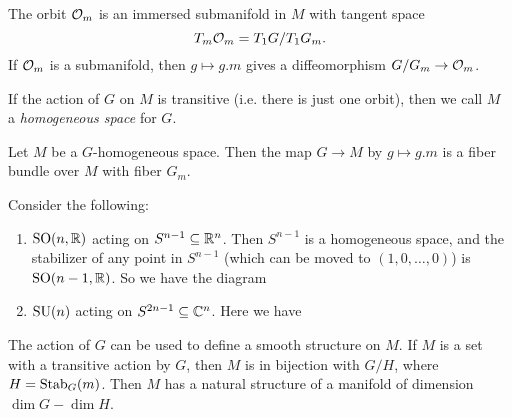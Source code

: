 \begin{corollary}
  The orbit $\mathcal{O}_m$ is an immersed
  submanifold in $M$ with tangent
  space \[T_m \mathcal{O}_m = T_1 G / T_1 G_m.\]
  If $\mathcal{O}_m$ is a submanifold, then
  $g \mapsto g . m$ gives a diffeomorphism
  $G / G_m \to \mathcal{O}_m$.
\end{corollary}

\begin{definition}
  If the action of $G$ on $M$ is
  transitive (i.e. there is just one orbit),
  then we call $M$ a
  \emph{homogeneous space} for $G$.
\end{definition}

\begin{corollary}
  Let $M$ be a $G$-homogeneous space.
  Then the map $G \to M$
  by $g \mapsto g . m$ is a fiber bundle
  over $M$ with fiber $G_m$.
\end{corollary}

\begin{example}
  Consider the following:
  \begin{enumerate}
    \item $\operatorname{SO}(n, \mathbb{R})$ acting
      on $S^{n - 1} \subseteq \mathbb{R}^n$.
      Then $S^{n - 1}$ is a
      homogeneous space, and the stabilizer
      of any point in $S^{n - 1}$
      (which can be moved to $(1, 0, \dots, 0)$)
      is $\operatorname{SO}(n - 1, \mathbb{R})$. So we have
      the diagram
      \begin{center}
      \end{center}
    \item $\operatorname{SU}(n)$ acting on
      $S^{2n - 1} \subseteq \mathbb{C}^n$.
      Here we have
      \begin{center}
      \end{center}
  \end{enumerate}
\end{example}

\begin{remark}
  The action of $G$ can be used to
  define a smooth structure on $M$.
  If $M$ is a set with a transitive
  action by $G$, then $M$ is in
  bijection with $G / H$, where
  $H = \operatorname{Stab}_G(m)$. Then $M$ has a natural
  structure of a manifold of dimension
  $\dim G - \dim H$.
\end{remark}

